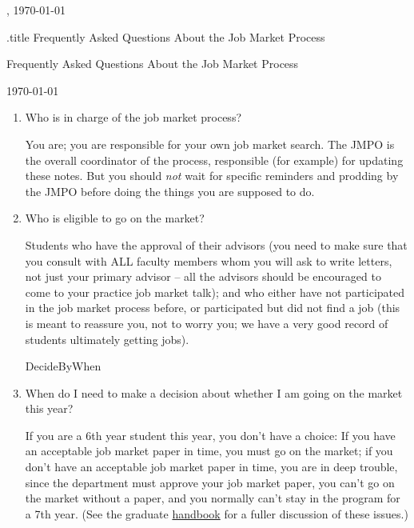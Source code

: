 \documentclass{econtex}
\providecommand\phantomsection{}
\begin{document}
\hfill{\tiny \jobname, \today} \vspace{.1in}

\begin{verbatimwrite}{\jobname.title}
Frequently Asked Questions About the Job Market Process
\end{verbatimwrite}

\centerline{\Large Frequently Asked Questions About the Job Market Process}\medskip\medskip

\centerline{\today}\medskip\medskip

\ifdvi\large\fi

\begin{enumerate}

\item Who is in charge of the job market process?
  
  You are; you are responsible for your own job market search.  The
  JMPO is the overall coordinator of the process, responsible (for
  example) for updating these notes.  But you should {\it not} wait
  for specific reminders and prodding by the JMPO before doing the
  things you are supposed to do.

\item Who is eligible to go on the market?
  
  Students who have the approval of their advisors (you need to make
  sure that you consult with ALL faculty members whom you will ask to
  write letters, not just your primary advisor -- all the advisors
  should be encouraged to come to your practice job market talk); and
  who either have not participated in the job market process before,
  or participated but did not find a job (this is meant to reassure
  you, not to worry you; we have a very good record of students
  ultimately getting jobs).

  \ifdvi\phantomsection\hypertarget{DecideByWhen}{DecideByWhen}\fi
  
\item When do I need to make a decision about whether I am going on
the market this year?

If you are a 6th year student this year, you don't have a choice: If
you have an acceptable job market paper in time, you must go on the
market; if you don't have an acceptable job market paper in time, you
are in deep trouble, since the department must approve your job market
paper, you can't go on the market without a paper, and you normally can't stay
in the program for a 7th year.  (See the graduate \href{http://www.econ2.jhu.edu/pdf/Econ\_Grad\_Handbook.pdf}{handbook} for a fuller discussion of these issues.) 


\end{enumerate}
\end{document}
